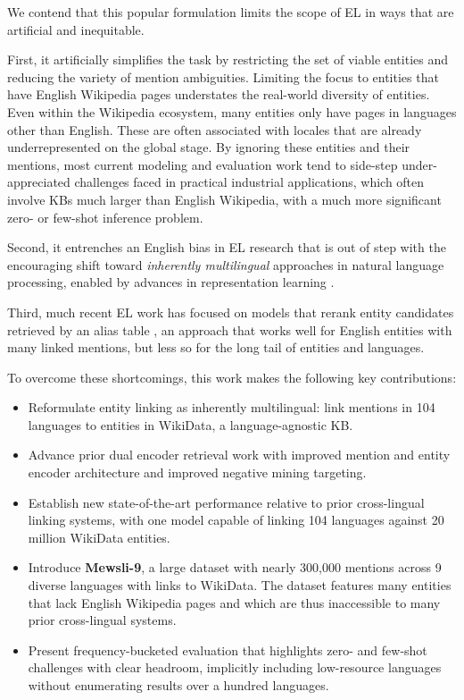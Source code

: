 \documentclass[11pt,a4paper]{article}
\begin{document}
We contend that this popular formulation limits the scope of EL in ways that are artificial and inequitable.

First, it artificially simplifies the task by restricting the set of viable entities and reducing the variety of mention ambiguities. Limiting the focus to entities that have English Wikipedia pages understates the real-world diversity of entities.
Even within the Wikipedia ecosystem, many entities only have pages in languages other than English.
These are often associated with locales that are already underrepresented on the global stage.
By ignoring these entities and their mentions, most current modeling and evaluation work tend to side-step under-appreciated challenges faced in practical industrial applications, which often involve KBs much larger than English Wikipedia, with a much more significant zero- or few-shot inference problem.

Second, it entrenches an English bias in EL research that is out of step with the encouraging shift toward \emph{inherently multilingual} approaches in natural language processing, enabled by advances in representation learning \cite{johnson2017google,pires-etal-2019-multilingual,conneau-etal-2020-unsupervised}.

Third, much recent EL work has focused on models that rerank entity candidates retrieved by an alias table \citep{fevry2020empirical}, an approach that works well for English entities with many linked mentions, but less so for the long tail of entities and languages.

To overcome these shortcomings, this work makes the following key contributions:

\begin{itemize}
    \item Reformulate entity linking as inherently multilingual: link mentions in 104 languages to entities in WikiData, a language-agnostic KB.
    \item Advance prior dual encoder retrieval work with improved mention and entity encoder architecture and improved negative mining targeting.
    \item Establish new state-of-the-art performance relative to prior cross-lingual linking systems, with one model capable of linking 104 languages against 20 million WikiData entities.
    \item Introduce \textbf{Mewsli-9}, a large dataset with nearly 300,000 mentions across 9 diverse languages with links to WikiData. The dataset features many entities that lack English Wikipedia pages and which are thus inaccessible to many prior cross-lingual systems.
    \item Present frequency-bucketed evaluation that highlights zero- and few-shot challenges with clear headroom, implicitly including low-resource languages without enumerating results over a hundred languages. 
\end{itemize}
\end{document}
